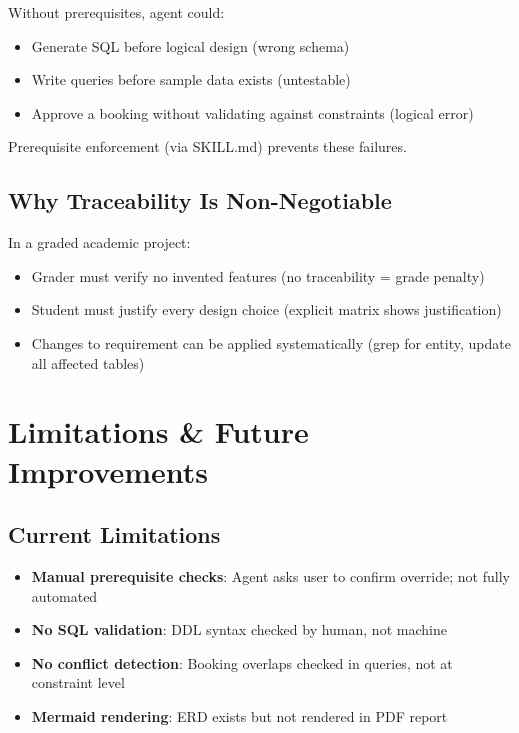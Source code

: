 \documentclass[12pt,a4paper]{article}
\begin{document}
Without prerequisites, agent could:
\begin{itemize}
    \item Generate SQL before logical design (wrong schema)
    \item Write queries before sample data exists (untestable)
    \item Approve a booking without validating against constraints (logical error)
\end{itemize}

Prerequisite enforcement (via SKILL.md) prevents these failures.

\subsection{Why Traceability Is Non-Negotiable}

In a graded academic project:
\begin{itemize}
    \item Grader must verify no invented features (no traceability = grade penalty)
    \item Student must justify every design choice (explicit matrix shows justification)
    \item Changes to requirement can be applied systematically (grep for entity, update all affected tables)
\end{itemize}

\section{Limitations \& Future Improvements}

\subsection{Current Limitations}
\begin{itemize}
    \item \textbf{Manual prerequisite checks}: Agent asks user to confirm override; not fully automated
    \item \textbf{No SQL validation}: DDL syntax checked by human, not machine
    \item \textbf{No conflict detection}: Booking overlaps checked in queries, not at constraint level
    \item \textbf{Mermaid rendering}: ERD exists but not rendered in PDF report
\end{itemize}
\end{document}

